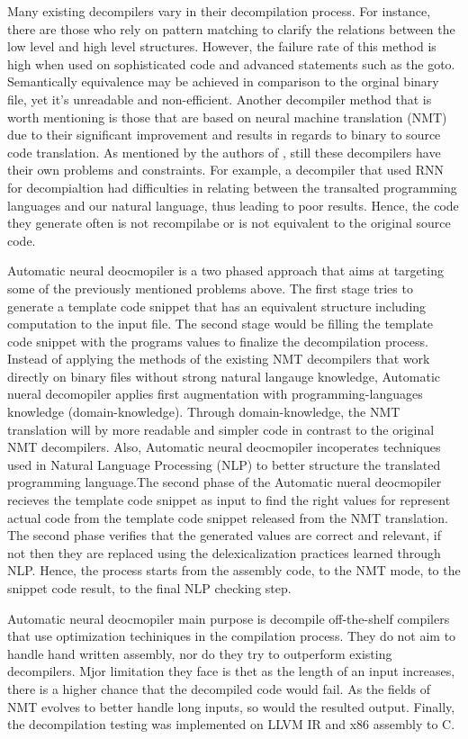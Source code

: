 \documentclass[conference,a4paper]{IEEEtran}
\begin{document}
Many existing decompilers vary in their decompilation process. For instance, there are those who rely on pattern matching to clarify the relations between the low level and high level structures. However, the failure rate of this method is high when used on sophisticated code and advanced statements
such as the goto. Semantically equivalence may be achieved in comparison to the orginal binary file, yet it's unreadable and non-efficient. Another decompiler method that is worth mentioning is those that are based on neural machine translation (NMT) due to their significant improvement and results in regards to binary to source code translation.
As mentioned by the authors of \cite{katz_towards_2019}, still these decompilers have their own problems and constraints. For example, a decompiler that used RNN for decompialtion had difficulties in relating between the transalted programming languages and our natural language, thus leading to poor results. Hence, the code they generate often is not recompilabe or is not equivalent to the original source code.

Automatic neural deocmopiler is a two phased approach that aims at targeting some of the previously mentioned problems above. The first stage tries to generate a template code snippet that has an equivalent structure including computation to the input file. The second stage would be filling the template code snippet with the programs values to finalize the decompilation process.
Instead of applying the methods of the existing NMT decompilers that work directly on binary files without strong natural langauge knowledge, Automatic nueral decomopiler applies first augmentation with programming-languages knowledge (domain-knowledge). Through domain-knowledge, the NMT translation will by more readable and simpler code in contrast to the original NMT decompilers.
Also, Automatic neural deocmopiler incoperates techniques used in Natural Language Processing (NLP) to better structure the translated programming language.The second phase of the Automatic nueral deocmopiler recieves the template code snippet as input to find the right values for
represent actual code from the template code snippet released from the NMT translation. The second phase verifies that the generated values are correct and relevant, if not then they are replaced using the delexicalization practices learned through NLP. Hence, the process starts from the assembly code, to the NMT mode, to the snippet code result, to the final NLP checking step.

Automatic neural deocmopiler main purpose is decompile off-the-shelf compilers that use optimization techiniques in the compilation process. They do not aim to handle hand written assembly, nor do they try to outperform existing decompilers. Mjor limitation they face is thet as the length of an input
increases, there is a higher chance that the decompiled code would fail. As the fields of NMT evolves to better handle long inputs, so would the resulted output. Finally, the decompilation testing was implemented on LLVM IR
and x86 assembly to C.
\end{document}
